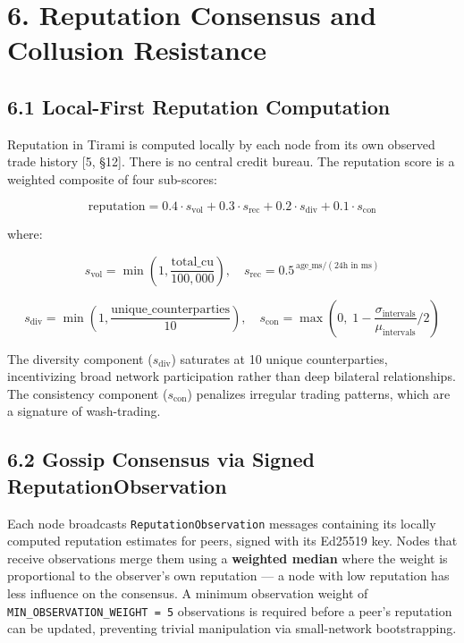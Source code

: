 \documentclass[
  11pt,
]{article}
\begin{document}
\section{6. Reputation Consensus and Collusion
Resistance}\label{reputation-consensus-and-collusion-resistance}

\subsection{6.1 Local-First Reputation
Computation}\label{local-first-reputation-computation}

Reputation in Tirami is computed locally by each node from its own
observed trade history {[}5, §12{]}. There is no central credit bureau.
The reputation score is a weighted composite of four sub-scores:

\[\text{reputation} = 0.4 \cdot s_{\text{vol}} + 0.3 \cdot s_{\text{rec}} + 0.2 \cdot s_{\text{div}} + 0.1 \cdot s_{\text{con}}\]

where:

\[s_{\text{vol}} = \min\!\left(1, \frac{\text{total\_cu}}{100{,}000}\right), \quad
  s_{\text{rec}} = 0.5^{\,\text{age\_ms} / (24 \text{h in ms})}\]

\[s_{\text{div}} = \min\!\left(1, \frac{\text{unique\_counterparties}}{10}\right), \quad
  s_{\text{con}} = \max\!\left(0,\; 1 - \frac{\sigma_{\text{intervals}}}{\mu_{\text{intervals}}} / 2\right)\]

The diversity component (\(s_{\text{div}}\)) saturates at 10 unique
counterparties, incentivizing broad network participation rather than
deep bilateral relationships. The consistency component
(\(s_{\text{con}}\)) penalizes irregular trading patterns, which are a
signature of wash-trading.

\subsection{6.2 Gossip Consensus via Signed
ReputationObservation}\label{gossip-consensus-via-signed-reputationobservation}

Each node broadcasts \texttt{ReputationObservation} messages containing
its locally computed reputation estimates for peers, signed with its
Ed25519 key. Nodes that receive observations merge them using a
\textbf{weighted median} where the weight is proportional to the
observer's own reputation --- a node with low reputation has less
influence on the consensus. A minimum observation weight of
\texttt{MIN\_OBSERVATION\_WEIGHT\ =\ 5} observations is required before
a peer's reputation can be updated, preventing trivial manipulation via
small-network bootstrapping.
\end{document}
